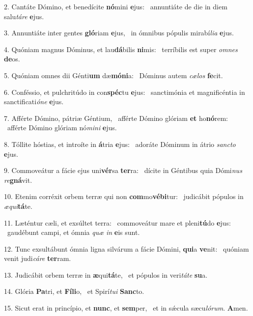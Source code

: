 2. Cantáte Dómino, et benedícite \textbf{nó}mini \textbf{e}jus: \ast\  annuntiáte de die in diem salu\textit{tá}\textit{re} \textbf{e}jus.\

3. Annuntiáte inter gentes \textbf{gló}riam \textbf{e}jus, \ast\  in ómnibus pópulis mirabí\textit{li}\textit{a} \textbf{e}jus.\

4. Quóniam magnus Dóminus, et lau\textbf{dá}bilis \textbf{ni}mis: \ast\  terríbilis est super \textit{om}\textit{nes} \textbf{de}os.\

5. Quóniam omnes dii Génti\textbf{um} dæ\textbf{mó}\textbf{ni}a: \ast\  Dóminus autem \textit{cæ}\textit{los} \textbf{fe}cit.\

6. Conféssio, et pulchritúdo in con\textbf{spéc}tu \textbf{e}jus: \ast\  sanctimónia et magnificéntia in sanctificati\textit{ó}\textit{ne} \textbf{e}jus.\

7. Afférte Dómino, pátriæ Géntium, \dag\  afférte Dómino glóriam \textbf{et} ho\textbf{nó}rem: \ast\  afférte Dómino glóriam nó\textit{mi}\textit{ni} \textbf{e}jus.\

8. Tóllite hóstias, et introíte in \textbf{á}tria \textbf{e}jus: \ast\  adoráte Dóminum in átrio \textit{sanc}\textit{to} \textbf{e}jus.\

9. Commoveátur a fácie ejus uni\textbf{vér}sa \textbf{ter}ra: \ast\  dícite in Géntibus quia Dómi\textit{nus} \textit{re}\textbf{gná}vit.\

10. Etenim corréxit orbem terræ qui non \textbf{com}mo\textbf{vé}\textbf{bi}tur: \ast\  judicábit pópulos in \textit{æ}\textit{qui}\textbf{tá}te.\

11. Læténtur cæli, et exsúltet terra: \dag\  commoveátur mare et pleni\textbf{tú}do \textbf{e}jus: \ast\  gaudébunt campi, et ómnia \textit{quæ} \textit{in} \textbf{e}is sunt.\

12. Tunc exsultábunt ómnia ligna silvárum a fácie Dómini, \textbf{qui}a \textbf{ve}nit: \ast\  quóniam venit judi\textit{cá}\textit{re} \textbf{ter}ram.\

13. Judicábit orbem terræ in \textbf{æ}qui\textbf{tá}te, \ast\  et pópulos in veri\textit{tá}\textit{te} \textbf{su}a.\

14. Glória \textbf{Pa}tri, et \textbf{Fí}\textbf{li}o, \ast\  et Spirí\textit{tu}\textit{i} \textbf{Sanc}to.\

15. Sicut erat in princípio, et \textbf{nunc}, et \textbf{sem}per, \ast\  et in sǽcula sæcu\textit{ló}\textit{rum}. \textbf{A}men.\

